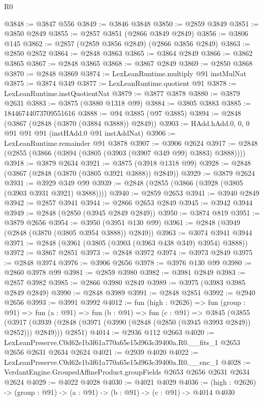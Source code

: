 \begin{lexlean}{R0}
\begin{coremodule}
@3848 := @3847 @556
@3849 := @3846 @3848
@3850 := @2859 @3849
@3851 := @3850 @2849
@3855 := @2857 @3851 (@2866 @3849 @2849)
@3856 := @3806 @145
@3862 := @2857 (@2859 @3856 @2849) (@2866 @3856 @2849)
@3863 := @2850 @2852
@3864 := @2848 @3863
@3865 := @3864 @2849
@3866 := @3862 @3865
@3867 := @2848 @3865
@3868 := @3867 @2849
@3869 := @2850 @3868
@3870 := @2848 @3869
@3874 := LexLeanRuntime.multiply @91 instMulNat
@3875 := @3874 @349
@3877 := LexLeanRuntime.quotient @91
@3878 := LexLeanRuntime.instQuotientNat
@3879 := @3877 @3878
@3880 := @3879 @2631
@3883 := @3875 (@3880 @1318 @99)
@3884 := @3805 @3883
@3885 := 18446744073709551616
@3888 := @94 @3885 (@97 @3885)
@3894 := @2848 (@3867 (@2848 (@3870 (@3884 @3888)) @2849))
@3903 := HAdd.hAdd.{0, 0, 0} @91 @91 @91 (instHAdd.{0} @91 instAddNat)
@3906 := LexLeanRuntime.remainder @91 @3878
@3907 := @3906 @2624
@3917 := @2848 (@2855 (@3866 (@3894 (@3805 (@3903 (@3907 @349 @99) @3883) @3888))))
@3918 := @3879 @2634
@3921 := @3875 (@3918 @1318 @99)
@3928 := @2848 (@3867 (@2848 (@3870 (@3805 @3921 @3888)) @2849))
@3929 := @3879 @2624
@3931 := @3929 @349 @99
@3939 := @2848 (@2855 (@3866 (@3928 (@3805 (@3903 @3931 @3921) @3888))))
@3940 := @2859 @2653
@3941 := @3940 @2849
@3942 := @2857 @3941
@3944 := @2866 @2653 @2849
@3945 := @3942 @3944
@3949 := @2848 (@2850 (@3945 @2849 @2849))
@3950 := @3874 @819
@3951 := @3879 @2656
@3954 := @3950 (@3951 @130 @99)
@3961 := @2848 (@3949 (@2848 (@3870 (@3805 @3954 @3888)) @2849))
@3963 := @3074 @3941 @3944
@3971 := @2848 (@3961 (@3805 (@3903 (@3963 @438 @349) @3954) @3888))
@3972 := @3867 @2851
@3973 := @2848 @3972
@3974 := @3973 @2849
@3975 := @2848 @3974
@3976 := @3906 @2656
@3978 := @3976 @130 @99
@3980 := @2860 @3978 @99
@3981 := @2859 @3980
@3982 := @3981 @2849
@3983 := @2857 @3982
@3985 := @2866 @3980 @2849
@3989 := @3975 (@3983 @3985 @2849 @2849)
@3990 := @2848 @3989
@3991 := @2848 @2851
@3992 := @2940 @2656
@3993 := @3991 @3992
@4012 := fun (high : @2626) =>
  fun (group : @91) =>
  fun (a : @91) =>
  fun (b : @91) =>
  fun (c : @91) =>
  @3845
    (@3855
      (@3917 (@3939 (@2848 (@3971 (@3990 (@2848 (@2850 (@3945 @3993 @2849)) @2852))) @2849)))
      @2851)
@4014 := @2936 @112 @2663
@4020 := LexLeanPreserve.C0d62e1b3f61a770a65e15d963c39400a.R0.__fits_1 @2653 @2656 @2631 @2634 @2624
@4021 := @2939 @4020
@4022 := LexLeanPreserve.C0d62e1b3f61a770a65e15d963c39400a.R0.__enc_1
@4028 := VerdantEngine.GroupedAffineProduct.groupFields @2653 @2656 @2631 @2634 @2624
@4029 := @4022 @4028
@4030 := @4021 @4029
@4036 := (high : @2626) -> (group : @91) -> (a : @91) -> (b : @91) -> (c : @91) -> @4014 @4030

\end{coremodule}
\end{lexlean}
